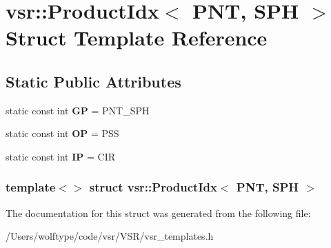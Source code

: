 \hypertarget{structvsr_1_1_product_idx_3_01_p_n_t_00_01_s_p_h_01_4}{\section{vsr\-:\-:Product\-Idx$<$ P\-N\-T, S\-P\-H $>$ Struct Template Reference}
\label{structvsr_1_1_product_idx_3_01_p_n_t_00_01_s_p_h_01_4}
}
\subsection*{Static Public Attributes}
\begin{DoxyCompactItemize}
\item 
\hypertarget{structvsr_1_1_product_idx_3_01_p_n_t_00_01_s_p_h_01_4_a97f231f3683846f906eb591504097dac}{static const int {\bfseries G\-P} = P\-N\-T\-\_\-\-S\-P\-H}\label{structvsr_1_1_product_idx_3_01_p_n_t_00_01_s_p_h_01_4_a97f231f3683846f906eb591504097dac}

\item 
\hypertarget{structvsr_1_1_product_idx_3_01_p_n_t_00_01_s_p_h_01_4_a3069b617aa89292f1d2ef8b07fb6f8ff}{static const int {\bfseries O\-P} = P\-S\-S}\label{structvsr_1_1_product_idx_3_01_p_n_t_00_01_s_p_h_01_4_a3069b617aa89292f1d2ef8b07fb6f8ff}

\item 
\hypertarget{structvsr_1_1_product_idx_3_01_p_n_t_00_01_s_p_h_01_4_a823be1aa1317acb31567cd1606c94848}{static const int {\bfseries I\-P} = C\-I\-R}\label{structvsr_1_1_product_idx_3_01_p_n_t_00_01_s_p_h_01_4_a823be1aa1317acb31567cd1606c94848}

\end{DoxyCompactItemize}
\subsubsection*{template$<$$>$ struct vsr\-::\-Product\-Idx$<$ P\-N\-T, S\-P\-H $>$}



The documentation for this struct was generated from the following file\-:\begin{DoxyCompactItemize}
\item 
/\-Users/wolftype/code/vsr/\-V\-S\-R/vsr\-\_\-templates.\-h\end{DoxyCompactItemize}
